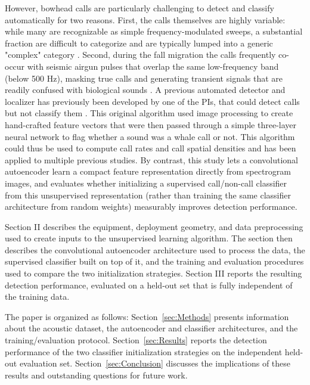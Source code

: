 \documentclass[preprint,NumberedRefs]{JASAnew}
\begin{document}
However, bowhead calls are particularly challenging to detect and classify automatically
for two reasons. First, the calls themselves are highly variable: while many are
recognizable as simple frequency-modulated sweeps, a substantial fraction are difficult
to categorize and are typically lumped into a generic "complex" category
\cite{clark1984sounds, stafford2021acoustic}. Second, during the fall migration the calls
frequently co-occur with seismic airgun pulses that overlap the same low-frequency band
(below 500 Hz), masking true calls and generating transient signals that are readily
confused with biological sounds \cite{blackwell2015effects, thode2012automated}.
A previous automated detector and localizer has previously been developed by one of the PIs, that could detect calls but not classify them \cite{thode2012automated}.  This original algorithm used image processing to create hand-crafted feature vectors that were then passed through a simple three-layer neural network to flag whether a sound was a whale call or not.  This algorithm could thus be used to compute call rates and call spatial densities and has been applied to multiple previous studies\cite{thode2016source,thode2017decadal,thode2020roaring,thode2024statistical,blackwell2015effects}.  By contrast, this study lets a convolutional autoencoder\cite{guo2017deep,ozanich2021deep} learn a compact feature representation directly from spectrogram images, and evaluates whether initializing a supervised call/non-call classifier from this unsupervised representation (rather than training the same classifier architecture from random weights) measurably improves detection performance.

Section II describes the equipment, deployment geometry, and data preprocessing used to create inputs to the unsupervised learning algorithm.  The section then describes the convolutional autoencoder architecture used to process the data, the supervised classifier built on top of it, and the training and evaluation procedures used to compare the two initialization strategies.  Section III reports the resulting detection performance, evaluated on a held-out set that is fully independent of the training data.


The paper is organized as follows: Section~\ref{sec:Methods} presents
information about the acoustic dataset, the autoencoder and classifier architectures,
and the training/evaluation protocol. Section~\ref{sec:Results} reports the detection
performance of the two classifier initialization strategies on the independent
held-out evaluation set. Section~\ref{sec:Conclusion} discusses the implications of
these results and outstanding questions for future work.
\end{document}

